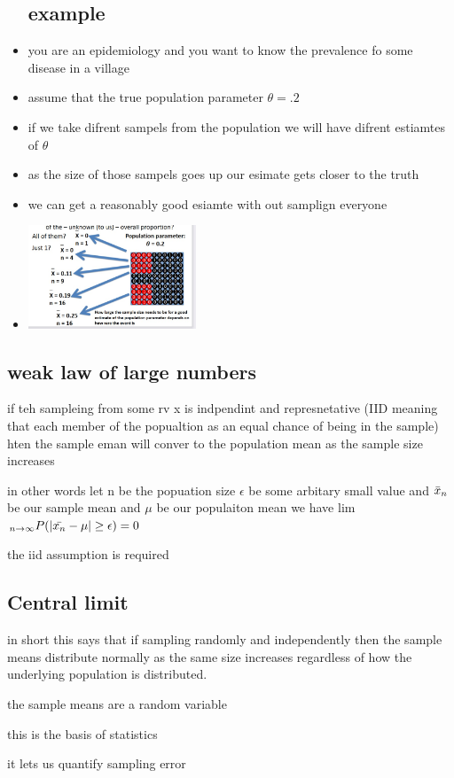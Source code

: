 \documentclass{article}
\begin{document}
\begin{itemize}
\subsection{example}
\item you are an epidemiology and you want to know the prevalence fo some disease in a village
\item assume that the true population parameter $\theta=.2$
\item if we take difrent sampels from the population we will have difrent estiamtes of $\theta$
\item as the size of those sampels goes up our esimate gets closer to the truth 
\item we can get a reasonably good esiamte with out samplign everyone 

\item  \includegraphics[width=5cm]{Final_Review/lecture_3/lecture 3 exmaple 23.jpg} 
\end{itemize}
\subsection{weak law of large numbers }
\item if teh sampleing from some rv x is indpendint and represnetative (IID meaning that each member of the popualtion as an equal chance of being in the sample) hten the sample eman will conver to the population mean as the sample size increases 
\item in other words let n be the popuation size $\epsilon$ be some arbitary small value and $\Bar{x}_n$ be our sample mean and $\mu$ be our populaiton mean  we have lim$_{n\rightarrow \infty}P(|\Bar{x_n}-\mu|\geq \epsilon)=0$
\item the iid assumption is required
\subsection{Central limit}
\item in short this says that if sampling randomly and independently then the sample means distribute normally as the same size increases regardless of how the underlying population is distributed. 
\item the sample means are a random variable 
\item this is the basis of statistics
\item it lets us quantify sampling error 
\end{document}
